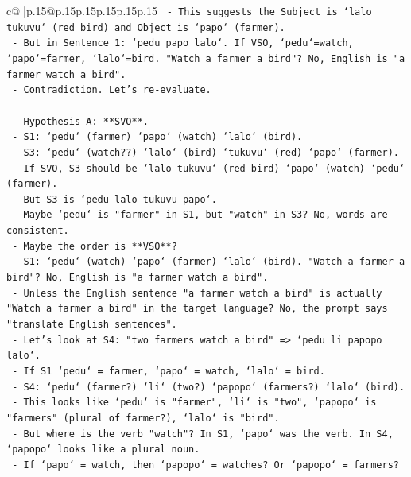 \documentclass{article}
\begin{document}
{\begin{supertabular}{c@{$\;$}|p{.15\linewidth}@{}p{.15\linewidth}p{.15\linewidth}p{.15\linewidth}p{.15\linewidth}p{.15\linewidth}}
{{{\texttt{         {-} This suggests the Subject is `lalo tukuvu` (red bird) and Object is `papo` (farmer).} \\
\texttt{         {-} But in Sentence 1: `pedu papo lalo`. If VSO, `pedu`=watch, `papo`=farmer, `lalo`=bird. "Watch a farmer a bird"? No, English is "a farmer watch a bird".} \\
\texttt{         {-} Contradiction. Let's re{-}evaluate.} \\
\\ 
\texttt{       {-} Hypothesis A: **SVO**.} \\
\texttt{         {-} S1: `pedu` (farmer) `papo` (watch) `lalo` (bird).} \\
\texttt{         {-} S3: `pedu` (watch??) `lalo` (bird) `tukuvu` (red) `papo` (farmer).} \\
\texttt{         {-} If SVO, S3 should be `lalo tukuvu` (red bird) `papo` (watch) `pedu` (farmer).} \\
\texttt{         {-} But S3 is `pedu lalo tukuvu papo`.} \\
\texttt{         {-} Maybe `pedu` is "farmer" in S1, but "watch" in S3? No, words are consistent.} \\
\texttt{         {-} Maybe the order is **VSO**?} \\
\texttt{           {-} S1: `pedu` (watch) `papo` (farmer) `lalo` (bird). "Watch a farmer a bird"? No, English is "a farmer watch a bird".} \\
\texttt{           {-} Unless the English sentence "a farmer watch a bird" is actually "Watch a farmer a bird" in the target language? No, the prompt says "translate English sentences".} \\
\texttt{           {-} Let's look at S4: "two farmers watch a bird" => `pedu li papopo lalo`.} \\
\texttt{             {-} If S1 `pedu` = farmer, `papo` = watch, `lalo` = bird.} \\
\texttt{             {-} S4: `pedu` (farmer?) `li` (two?) `papopo` (farmers?) `lalo` (bird).} \\
\texttt{             {-} This looks like `pedu` is "farmer", `li` is "two", `papopo` is "farmers" (plural of farmer?), `lalo` is "bird".} \\
\texttt{             {-} But where is the verb "watch"? In S1, `papo` was the verb. In S4, `papopo` looks like a plural noun.} \\
\texttt{             {-} If `papo` = watch, then `papopo` = watches? Or `papopo` = farmers?} \\
}}}
\end{supertabular}}
\end{document}
